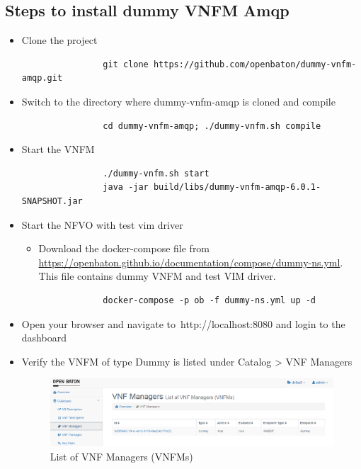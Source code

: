 			\subsection*{Steps to install dummy VNFM Amqp}
			\begin{itemize}
				
				\item Clone the project
				\begin{lstlisting}
				git clone https://github.com/openbaton/dummy-vnfm-amqp.git 
				\end{lstlisting}
				
				\item Switch to the directory where dummy-vnfm-amqp is cloned and compile
				\begin{lstlisting}
				cd dummy-vnfm-amqp; ./dummy-vnfm.sh compile
				\end{lstlisting}
				
				\item Start the VNFM
				\begin{lstlisting}
				./dummy-vnfm.sh start
				java -jar build/libs/dummy-vnfm-amqp-6.0.1-SNAPSHOT.jar
				\end{lstlisting}
				
				\item Start the NFVO with test vim driver
				\begin{itemize}
					\item Download the docker-compose file from \hyperlink{name}{https://openbaton.github.io/documentation/compose/dummy-ns.yml}. This file contains dummy VNFM and test VIM driver.
				\end{itemize}
				\begin{lstlisting}
				docker-compose -p ob -f dummy-ns.yml up -d
				\end{lstlisting}
				
				\item Open your browser and navigate to http://localhost:8080 and login to the dashboard
				\item Verify the VNFM of type Dummy is listed under Catalog > VNF Managers
				\begin{figure} [h]
					\centering
					\includegraphics[width=0.7\linewidth]{figures/VNFMList}
					\caption{List of VNF Managers (VNFMs)}
					\label{fig:VNFMList}
				\end{figure}
			\end{itemize}
			
